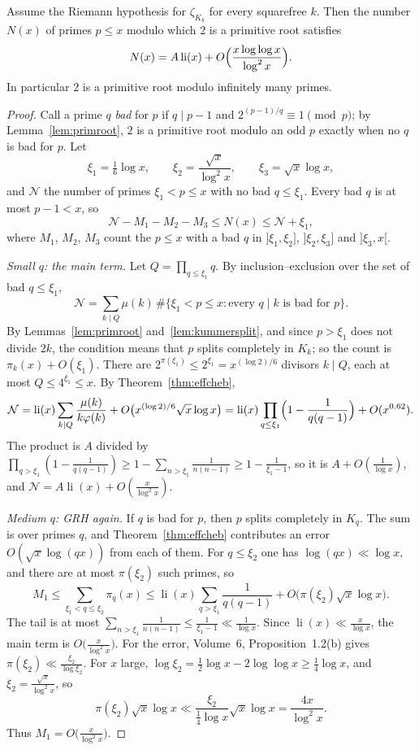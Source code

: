 \begin{theorem}\label{thm:hooley}
Assume the Riemann hypothesis for $\zeta_{K_k}$ for every squarefree $k$. Then the number $N(x)$ of primes $p\le x$ modulo which $2$ is a primitive root satisfies
\[
N(x)=A\operatorname{li}(x)+O\Bigl(\frac{x\log\log x}{\log^2x}\Bigr).
\]
In particular $2$ is a primitive root modulo infinitely many primes.
\end{theorem}
\begin{proof}
Call a prime $q$ \emph{bad} for $p$ if $q\mid p-1$ and $2^{(p-1)/q}\equiv1\pmod p$; by Lemma~\ref{lem:primroot}, $2$ is a primitive root modulo an odd $p$ exactly when no $q$ is bad for $p$. Let
\[
\xi_1=\tfrac16\log x,\qquad\xi_2=\frac{\sqrt x}{\log^2x},\qquad\xi_3=\sqrt x\log x,
\]
and $\mathcal N$ the number of primes $\xi_1<p\le x$ with no bad $q\le\xi_1$. Every bad $q$ is at most $p-1<x$, so
\[
\mathcal N-M_1-M_2-M_3\le N(x)\le\mathcal N+\xi_1,
\]
where $M_1$, $M_2$, $M_3$ count the $p\le x$ with a bad $q$ in $]\xi_1,\xi_2]$, $]\xi_2,\xi_3]$ and $]\xi_3,x[$.

\emph{Small $q$: the main term.} Let $Q=\prod_{q\le\xi_1}q$. By inclusion--exclusion over the set of bad $q\le\xi_1$,
\[
\mathcal N=\sum_{k\mid Q}\mu(k)\,\#\{\xi_1<p\le x:\text{every }q\mid k\text{ is bad for }p\}.
\]
By Lemmas~\ref{lem:primroot} and~\ref{lem:kummersplit}, and since $p>\xi_1$ does not divide $2k$, the condition means that $p$ splits completely in $K_k$; so the count is $\pi_k(x)+O(\xi_1)$. There are $2^{\pi(\xi_1)}\le2^{\xi_1}=x^{(\log2)/6}$ divisors $k\mid Q$, each at most $Q\le4^{\xi_1}\le x$. By Theorem~\ref{thm:effcheb},
\[
\mathcal N=\operatorname{li}(x)\sum_{k\mid Q}\frac{\mu(k)}{k\varphi(k)}+O\bigl(x^{(\log2)/6}\sqrt x\log x\bigr)=\operatorname{li}(x)\prod_{q\le\xi_1}\Bigl(1-\frac1{q(q-1)}\Bigr)+O(x^{0.62}).
\]
The product is $A$ divided by $\prod_{q>\xi_1}(1-\frac1{q(q-1)})\ge1-\sum_{n>\xi_1}\frac1{n(n-1)}\ge1-\frac1{\xi_1-1}$, so it is $A+O(\frac1{\log x})$, and $\mathcal N=A\operatorname{li}(x)+O(\frac x{\log^2x})$.

\emph{Medium $q$: GRH again.} If $q$ is bad for $p$, then $p$ splits completely in $K_q$. The sum is over primes $q$, and Theorem~\ref{thm:effcheb} contributes an error $O(\sqrt x\log(qx))$ from each of them. For $q\le\xi_2$ one has $\log(qx)\ll\log x$, and there are at most $\pi(\xi_2)$ such primes, so
\[
M_1\le\sum_{\xi_1<q\le\xi_2}\pi_q(x)\le\operatorname{li}(x)\sum_{q>\xi_1}\frac1{q(q-1)}+O\bigl(\pi(\xi_2)\sqrt x\log x\bigr).
\]
The tail is at most $\sum_{n>\xi_1}\frac1{n(n-1)}\le\frac1{\xi_1-1}\ll\frac1{\log x}$. Since $\operatorname{li}(x)\ll\frac x{\log x}$, the main term is $O\bigl(\frac x{\log^2x}\bigr)$. For the error, Volume~6, Proposition~1.2(b) gives $\pi(\xi_2)\ll\frac{\xi_2}{\log\xi_2}$. For $x$ large, $\log\xi_2=\frac12\log x-2\log\log x\ge\frac14\log x$, and $\xi_2=\frac{\sqrt x}{\log^2x}$, so
\[
\pi(\xi_2)\sqrt x\log x\ll\frac{\xi_2}{\frac14\log x}\sqrt x\log x=\frac{4x}{\log^2x}.
\]
Thus $M_1=O\bigl(\frac x{\log^2x}\bigr)$.


\end{proof}
